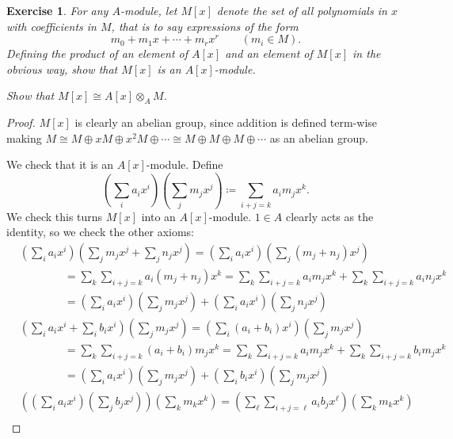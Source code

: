 \documentclass[12pt,letterpaper]{article}
\newtheorem{problem}{Exercise}[section]
\theoremstyle{definition}
\theoremstyle{remark}
\numberwithin{figure}{problem}
\numberwithin{equation}{section}
\begin{document}
\begin{problem}\label{exc:2.6}
  For any $A$-module, let $M[x]$ denote the set of all polynomials in $x$ with coefficients in $M$, that is to say expressions of the form
  \begin{equation*}
    m_0 + m_1x + \cdots + m_rx^r \qquad (m_i \in M).
  \end{equation*}
  Defining the product of an element of $A[x]$ and an element of $M[x]$ in the obvious way, show that $M[x]$ is an $A[x]$-module.
  \par Show that $M[x] \cong A[x] \otimes_A M$.
\end{problem}
\begin{proof}
  $M[x]$ is clearly an abelian group, since addition is defined term-wise making $M \cong M \oplus xM \oplus x^2M \oplus \cdots \cong M \oplus M \oplus M \oplus \cdots$ as an abelian group.
  \par We check that it is an $A[x]$-module. Define
  \begin{equation*}
    \left( \sum_i a_ix^i \right) \left( \sum_j m_jx^j \right) \coloneqq \sum_{i + j = k} a_im_jx^k. 
  \end{equation*}
  We check this turns $M[x]$ into an $A[x]$-module. $1 \in A$ clearly acts as the identity, so we check the other axioms:
  \begin{align*}
    &\left( \sum_i a_ix^i \right) \left( \sum_j m_jx^j + \sum_j n_jx^j \right) = \left( \sum_i a_ix^i \right) \left( \sum_j (m_j+n_j)x^j \right)\\
    &\qquad\qquad= \sum_k \sum_{i + j = k} a_i(m_j+n_j)x^k= \sum_k \sum_{i + j = k} a_im_jx^k + \sum_k \sum_{i + j = k} a_in_jx^k\\
    &\qquad\qquad= \left( \sum_i a_ix^i \right) \left( \sum_j m_jx^j \right) + \left( \sum_i a_ix^i \right) \left( \sum_j n_jx^j \right)\\
    &\left( \sum_i a_ix^i + \sum_i b_ix^i \right)\left( \sum_j m_jx^j \right) = \left( \sum_i (a_i+b_i)x^i \right)\left( \sum_j m_jx^j \right)\\
    &\qquad\qquad= \sum_k \sum_{i+j=k} (a_i+b_i)m_jx^k= \sum_k \sum_{i + j = k} a_im_jx^k + \sum_k \sum_{i + j = k} b_im_jx^k\\
    &\qquad\qquad= \left( \sum_i a_ix^i \right)\left( \sum_j m_jx^j \right) + \left( \sum_i b_ix^i \right)\left( \sum_j m_jx^j \right)\\
    &\left(\left( \sum_i a_ix^i\right)\left(\sum_j b_jx^j \right)\right)\left( \sum_k m_kx^k \right) = \left( \sum_\ell \sum_{i+j=\ell} a_ib_jx^\ell \right)\left( \sum_k m_kx^k \right)\\

\end{align*}
\end{proof}
\end{document}
